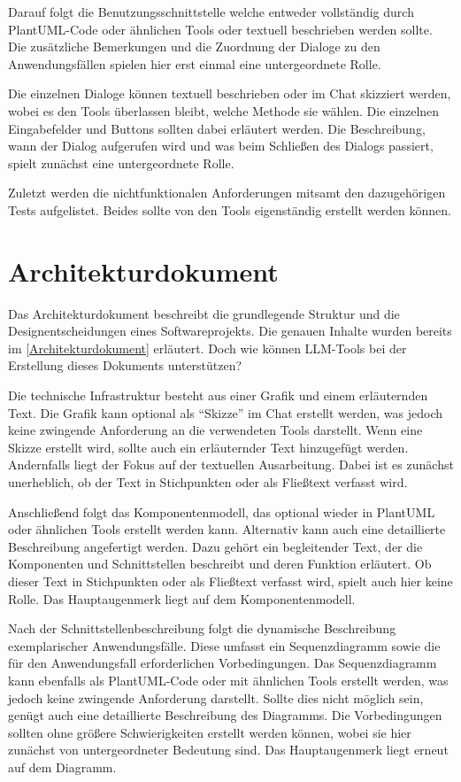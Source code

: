 Darauf folgt die Benutzungsschnittstelle welche entweder vollständig durch PlantUML-Code oder ähnlichen Tools 
oder textuell beschrieben werden sollte. Die zusätzliche Bemerkungen und die Zuordnung der Dialoge zu den Anwendungsfällen 
spielen hier erst einmal eine untergeordnete Rolle.

Die einzelnen Dialoge können textuell beschrieben oder im Chat skizziert werden, wobei es den Tools überlassen 
bleibt, welche Methode sie wählen. Die einzelnen Eingabefelder und Buttons sollten dabei erläutert werden. 
Die Beschreibung, wann der Dialog aufgerufen wird und was beim Schließen des Dialogs passiert, spielt zunächst 
eine untergeordnete Rolle.

Zuletzt werden die nichtfunktionalen Anforderungen mitsamt den dazugehörigen Tests aufgelistet. Beides sollte 
von den Tools eigenständig erstellt werden können.

\section{Architekturdokument}  \label{LLMArchitekturdokument}

Das Architekturdokument beschreibt die grundlegende Struktur und die Designentscheidungen eines Softwareprojekts. 
Die genauen Inhalte wurden bereits im \autoref{Architekturdokument} erläutert. Doch wie können LLM-Tools bei der 
Erstellung dieses Dokuments unterstützen?

Die technische Infrastruktur besteht aus einer Grafik und einem erläuternden Text. Die Grafik kann optional als 
``Skizze'' im Chat erstellt werden, was jedoch keine zwingende Anforderung an die verwendeten Tools darstellt. 
Wenn eine Skizze erstellt wird, sollte auch ein erläuternder Text hinzugefügt werden. Andernfalls liegt der 
Fokus auf der textuellen Ausarbeitung. Dabei ist es zunächst unerheblich, ob der Text in Stichpunkten oder als 
Fließtext verfasst wird.

Anschließend folgt das Komponentenmodell, das optional wieder in PlantUML oder ähnlichen Tools erstellt werden 
kann. Alternativ kann auch eine detaillierte Beschreibung angefertigt werden. Dazu gehört ein begleitender Text, 
der die Komponenten und Schnittstellen beschreibt und deren Funktion erläutert. Ob dieser Text in Stichpunkten 
oder als Fließtext verfasst wird, spielt auch hier keine Rolle. Das Hauptaugenmerk liegt auf dem Komponentenmodell.

Nach der Schnittstellenbeschreibung folgt die dynamische Beschreibung exemplarischer Anwendungsfälle. Diese umfasst 
ein Sequenzdiagramm sowie die für den Anwendungsfall erforderlichen Vorbedingungen. Das Sequenzdiagramm kann ebenfalls 
als PlantUML-Code oder mit ähnlichen Tools erstellt werden, was jedoch keine zwingende Anforderung darstellt. Sollte 
dies nicht möglich sein, genügt auch eine detaillierte Beschreibung des Diagramms. Die Vorbedingungen sollten ohne 
größere Schwierigkeiten erstellt werden können, wobei sie hier zunächst von untergeordneter Bedeutung sind. Das 
Hauptaugenmerk liegt erneut auf dem Diagramm.

